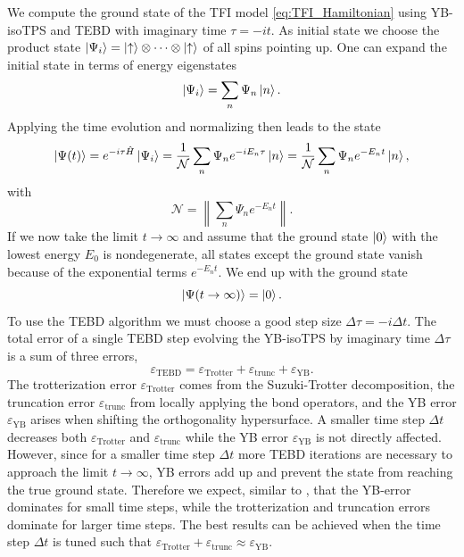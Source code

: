 We compute the ground state of the TFI model \eqref{eq:TFI_Hamiltonian} using YB-isoTPS and TEBD with imaginary time $\tau = -i t$. As initial state we choose the product state $\ket{\Psi_i}=\ket{\uparrow}\otimes\cdots\otimes\ket{\uparrow}$ of all spins pointing up. One can expand the initial state in terms of energy eigenstates
\begin{equation}
	\ket{\Psi_i} = \sum_{n} \Psi_n \ket{n}.
\end{equation}
Applying the time evolution and normalizing then leads to the state
\begin{equation}
	\ket{\Psi(t)} = e^{-i\tau\hat{H}} \ket{\Psi_i} = \frac{1}{\mathcal{N}} \sum_{n} \Psi_n e^{-iE_n\tau} \ket{n} = \frac{1}{\mathcal{N}} \sum_{n} \Psi_n e^{-E_nt} \ket{n},
\end{equation}
with
\begin{equation}
	\mathcal{N} = \left\lVert\sum_{n} \Psi_n e^{-E_nt}\right\rVert.
\end{equation}
If we now take the limit $t \rightarrow \infty$ and assume that the ground state $\ket{0}$ with the lowest energy $E_0$ is nondegenerate, all states except the ground state vanish because of the exponential terms $e^{-E_nt}$. We end up with the ground state
\begin{equation}
	\ket{\Psi(t\rightarrow\infty)} = \ket{0}.
\end{equation}
To use the TEBD algorithm we must choose a good step size $\Delta \tau = -i\Delta t$. The total error of a single TEBD step evolving the YB-isoTPS by imaginary time $\Delta \tau$ is a sum of three errors,
\begin{equation}
	\varepsilon_\text{TEBD} = \varepsilon_\text{Trotter} + \varepsilon_\text{trunc} + \varepsilon_{\text{YB}}.
\end{equation} 
The trotterization error $\varepsilon_\text{Trotter}$ comes from the Suzuki-Trotter decomposition, the truncation error $\varepsilon_\text{trunc}$ from locally applying the bond operators, and the YB error $\varepsilon_{\text{YB}}$ arises when shifting the orthogonality hypersurface. A smaller time step $\Delta t$ decreases both $\varepsilon_\text{Trotter}$ and $\varepsilon_\text{trunc}$ while the YB error $\varepsilon_{\text{YB}}$ is not directly affected. However, since for a smaller time step $\Delta t$ more TEBD iterations are necessary to approach the limit $t\rightarrow\infty$, YB errors add up and prevent the state from reaching the true ground state. Therefore we expect, similar to \cite{cite:isometric_tensor_network_states_in_two_dimensions, cite:efficient_simulation_of_dynamics_in_two_dimensional_quantum_spin_systems}, that the YB-error dominates for small time steps, while the trotterization and truncation errors dominate for larger time steps. The best results can be achieved when the time step $\Delta t$ is tuned such that $\varepsilon_\text{Trotter} + \varepsilon_\text{trunc} \approx \varepsilon_{\text{YB}}$. \par
